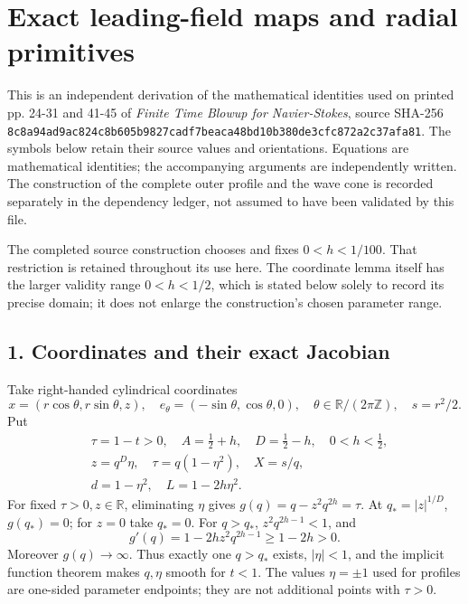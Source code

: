 \documentclass[10pt,a4paper]{article}
\begin{document}
\section{Exact leading-field maps and radial primitives}

This is an independent derivation of the mathematical identities used on printed pp. 24-31 and 41-45 of \emph{Finite Time Blowup for Navier-Stokes}, source SHA-256 \texttt{8c8a94ad}\allowbreak\texttt{9ac824c8}\allowbreak\texttt{b605b982}\allowbreak\texttt{7cadf7be}\allowbreak\texttt{aca48bd1}\allowbreak\texttt{0b380de3}\allowbreak\texttt{cfc872a2}\allowbreak\texttt{c37afa81}. The symbols below retain their source values and orientations. Equations are mathematical identities; the accompanying arguments are independently written. The construction of the complete outer profile and the wave cone is recorded separately in the dependency ledger, not assumed to have been validated by this file.

The completed source construction chooses and fixes \(0<h<1/100\). That restriction is retained throughout its use here. The coordinate lemma itself has the larger validity range \(0<h<1/2\), which is stated below solely to record its precise domain; it does not enlarge the construction's chosen parameter range.

\subsection{1. Coordinates and their exact Jacobian}

Take right-handed cylindrical coordinates
\[
x=(r\cos\theta,r\sin\theta,z),\quad e_\theta=(-\sin\theta,\cos\theta,0),
\quad \theta\in\mathbb R/(2\pi\mathbb Z),\quad s=r^2/2.
\]
Put
\[
\begin{aligned}
&\tau=1-t>0,\quad A=\tfrac12+h,\quad D=\tfrac12-h,\quad 0<h<\tfrac12,\\
&z=q^D\eta,\quad \tau=q(1-\eta^2),\quad X=s/q,\\
&d=1-\eta^2,\quad L=1-2h\eta^2.
\end{aligned}
\]
For fixed \(\tau>0,z\in\mathbb R\), eliminating \(\eta\) gives
\(g(q)=q-z^2q^{2h}=\tau\). At \(q_*=|z|^{1/D}\), \(g(q_*)=0\); for \(z=0\) take \(q_*=0\). For \(q>q_*\), \(z^2q^{2h-1}<1\), and
\[
g'(q)=1-2hz^2q^{2h-1}\ge1-2h>0.
\]
Moreover \(g(q)\to\infty\). Thus exactly one \(q>q_*\) exists, \(|\eta|<1\), and the implicit function theorem makes \(q,\eta\) smooth for \(t<1\). The values \(\eta=\pm1\) used for profiles are one-sided parameter endpoints; they are not additional points with \(\tau>0\).
\end{document}
